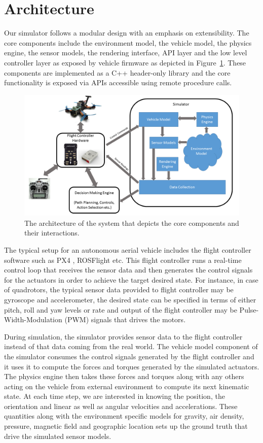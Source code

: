 \documentclass[graybox]{svmult}
\begin{document}
\section{Architecture}
Our simulator follows a modular design with an emphasis on extensibility. The core components include the environment model, the vehicle model, the physics engine, the sensor models, the rendering interface, API layer and the low level controller layer as exposed by vehicle firmware as depicted in Figure~\ref{fig:arch}. These components are implemented as a C++ header-only library and the core functionality is exposed via APIs accessible using remote procedure calls.

\begin{figure}[ttbp]
\includegraphics[width=\textwidth]{overview.PNG}
\caption{The architecture of the system that depicts the core components and their interactions.}
\label{fig:arch}
\end{figure}

The typical setup for an autonomous aerial vehicle includes the flight controller software such as PX4 \cite{meier2011pixhawk}, ROSFlight \cite{rosflight} etc. This flight controller runs a real-time control loop that receives the sensor data and then generates the control signals for the actuators in order to achieve the target desired state.
For instance, in case of quadrotors, the typical sensor data provided to flight controller may be gyroscope and accelerometer, the desired state can be specified in terms of either pitch, roll and yaw levels or rate and output of the flight controller may be Pulse-Width-Modulation (PWM) signals that drives the motors.

During simulation, the simulator provides sensor data to the flight controller instead of that data coming from the real world. The vehicle model component of the simulator consumes the control signals generated by the flight controller and it uses it to compute the forces and torques generated by the simulated actuators. The physics engine then takes these forces and torques along with any others acting on the vehicle from external environment to compute its next kinematic state. At each time step, we are interested in knowing the position, the orientation and linear as well as angular velocities and accelerations. These quantities along with the environment specific models for gravity, air density, pressure, magnetic field and geographic location sets up the ground truth that drive the simulated sensor models.
\end{document}
